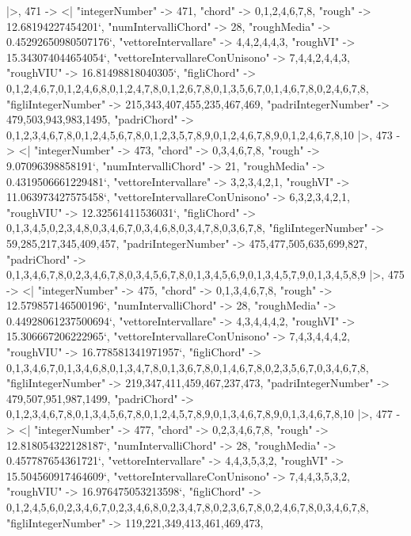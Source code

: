 \documentclass[
]{article}
\begin{document}
\begin{DatasetVerbatim}
  |>,
  471 -> <|
    "integerNumber" -> 471,
    "chord" -> {0,1,2,4,6,7,8},
    "rough" -> 12.68194227454201`,
    "numIntervalliChord" -> 28,
    "roughMedia" -> 0.45292650980507176`,
    "vettoreIntervallare" -> {4,4,2,4,4,3},
    "roughVI" -> 15.343074044654054`,
    "vettoreIntervallareConUnisono" -> {7,4,4,2,4,4,3},
    "roughVIU" -> 16.81498818040305`,
    "figliChord" -> {{0,1,2,4,6,7},{0,1,2,4,6,8},{0,1,2,4,7,8},{0,1,2,6,7,8},{0,1,3,5,6,7},{0,1,4,6,7,8},{0,2,4,6,7,8}},
    "figliIntegerNumber" -> {215,343,407,455,235,467,469},
    "padriIntegerNumber" -> {479,503,943,983,1495},
    "padriChord" -> {{0,1,2,3,4,6,7,8},{0,1,2,4,5,6,7,8},{0,1,2,3,5,7,8,9},{0,1,2,4,6,7,8,9},{0,1,2,4,6,7,8,10}}
  |>,
  473 -> <|
    "integerNumber" -> 473,
    "chord" -> {0,3,4,6,7,8},
    "rough" -> 9.07096398858191`,
    "numIntervalliChord" -> 21,
    "roughMedia" -> 0.4319506661229481`,
    "vettoreIntervallare" -> {3,2,3,4,2,1},
    "roughVI" -> 11.063973427575458`,
    "vettoreIntervallareConUnisono" -> {6,3,2,3,4,2,1},
    "roughVIU" -> 12.32561411536031`,
    "figliChord" -> {{0,1,3,4,5},{0,2,3,4,8},{0,3,4,6,7},{0,3,4,6,8},{0,3,4,7,8},{0,3,6,7,8}},
    "figliIntegerNumber" -> {59,285,217,345,409,457},
    "padriIntegerNumber" -> {475,477,505,635,699,827},
    "padriChord" -> {{0,1,3,4,6,7,8},{0,2,3,4,6,7,8},{0,3,4,5,6,7,8},{0,1,3,4,5,6,9},{0,1,3,4,5,7,9},{0,1,3,4,5,8,9}}
  |>,
  475 -> <|
    "integerNumber" -> 475,
    "chord" -> {0,1,3,4,6,7,8},
    "rough" -> 12.579857146500196`,
    "numIntervalliChord" -> 28,
    "roughMedia" -> 0.44928061237500694`,
    "vettoreIntervallare" -> {4,3,4,4,4,2},
    "roughVI" -> 15.306667206222965`,
    "vettoreIntervallareConUnisono" -> {7,4,3,4,4,4,2},
    "roughVIU" -> 16.778581341971957`,
    "figliChord" -> {{0,1,3,4,6,7},{0,1,3,4,6,8},{0,1,3,4,7,8},{0,1,3,6,7,8},{0,1,4,6,7,8},{0,2,3,5,6,7},{0,3,4,6,7,8}},
    "figliIntegerNumber" -> {219,347,411,459,467,237,473},
    "padriIntegerNumber" -> {479,507,951,987,1499},
    "padriChord" -> {{0,1,2,3,4,6,7,8},{0,1,3,4,5,6,7,8},{0,1,2,4,5,7,8,9},{0,1,3,4,6,7,8,9},{0,1,3,4,6,7,8,10}}
  |>,
  477 -> <|
    "integerNumber" -> 477,
    "chord" -> {0,2,3,4,6,7,8},
    "rough" -> 12.818054322128187`,
    "numIntervalliChord" -> 28,
    "roughMedia" -> 0.457787654361721`,
    "vettoreIntervallare" -> {4,4,3,5,3,2},
    "roughVI" -> 15.504560917464609`,
    "vettoreIntervallareConUnisono" -> {7,4,4,3,5,3,2},
    "roughVIU" -> 16.976475053213598`,
    "figliChord" -> {{0,1,2,4,5,6},{0,2,3,4,6,7},{0,2,3,4,6,8},{0,2,3,4,7,8},{0,2,3,6,7,8},{0,2,4,6,7,8},{0,3,4,6,7,8}},
    "figliIntegerNumber" -> {119,221,349,413,461,469,473},

\end{DatasetVerbatim}
\end{document}
